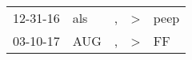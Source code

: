 \begin{supertabular}{lllll}
 12-31-16 &  als &  , &  \textgreater &  peep \\
 03-10-17 &  AUG &  , &  \textgreater &    FF \\
\end{supertabular}
